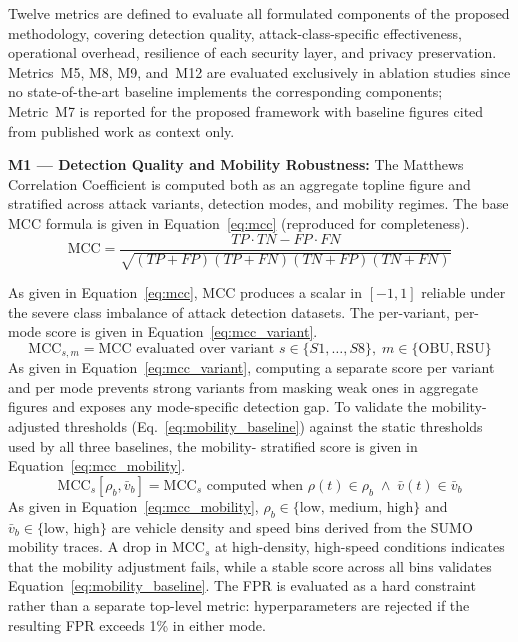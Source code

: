 \documentclass[12pt, a4paper]{report}
\begin{document}
{{Twelve metrics are defined to evaluate all formulated
components of the proposed methodology, covering detection
quality, attack-class-specific effectiveness, operational
overhead, resilience of each security layer, and privacy
preservation. Metrics~M5, M8, M9, and~M12 are evaluated
exclusively in ablation studies since no state-of-the-art
baseline implements the corresponding components; Metric~M7
is reported for the proposed framework with baseline figures
cited from published work as context only.


\textbf{M1 — Detection Quality and Mobility Robustness:}
The Matthews Correlation Coefficient is computed both
as an aggregate topline figure and stratified across
attack variants, detection modes, and mobility regimes.
The base \ac{MCC} formula is given in
Equation~\eqref{eq:mcc} (reproduced for completeness).
\begin{equation}
\text{MCC} =
\frac{TP \cdot TN - FP \cdot FN}
{\sqrt{(TP{+}FP)(TP{+}FN)(TN{+}FP)(TN{+}FN)}}
\label{eq:mcc}
\end{equation}



As given in Equation~\eqref{eq:mcc}, MCC produces a
scalar in $[-1,1]$ reliable under the severe class
imbalance of attack detection datasets.
The per-variant, per-mode score is given in
Equation~\eqref{eq:mcc_variant}.
\begin{equation}
\text{MCC}_{s,m} = \text{MCC evaluated over variant }
s \in \{S1,\ldots,S8\},\;
m \in \{\text{OBU},\text{RSU}\}
\label{eq:mcc_variant}
\end{equation}
As given in Equation~\eqref{eq:mcc_variant}, computing
a separate score per variant and per mode prevents
strong variants from masking weak ones in aggregate
figures and exposes any mode-specific detection gap.
To validate the mobility-adjusted thresholds
(Eq.~\ref{eq:mobility_baseline}) against the static
thresholds used by all three baselines, the mobility-
stratified score is given in
Equation~\eqref{eq:mcc_mobility}.
\begin{equation}
\text{MCC}_{s}[\rho_b, \bar{v}_b] =
\text{MCC}_{s}\text{ computed when }
\rho(t) \in \rho_b \;\land\;
\bar{v}(t) \in \bar{v}_b
\label{eq:mcc_mobility}
\end{equation}
As given in Equation~\eqref{eq:mcc_mobility},
$\rho_b \in \{\text{low, medium, high}\}$ and
$\bar{v}_b \in \{\text{low, high}\}$ are vehicle
density and speed bins derived from the SUMO mobility
traces. A drop in $\text{MCC}_{s}$ at high-density,
high-speed conditions indicates that the mobility
adjustment fails, while a stable score across all bins
validates Equation~\eqref{eq:mobility_baseline}.
The \ac{FPR} is evaluated as a hard constraint rather
than a separate top-level metric: hyperparameters are
rejected if the resulting FPR exceeds 1\% in either mode.


}}
\end{document}
